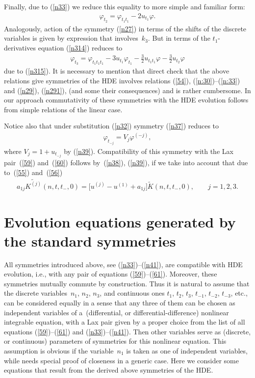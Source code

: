 \documentclass[pdftex]{sigma}
\numberwithin{equation}{section}
\begin{document}
Finally, due to (\ref{n33}) we reduce this equality to more simple and familiar form:
\begin{gather}
\varphi_{t_2}=\varphi_{t_1t_1}-2u_{t_1}\varphi.\label{n34}
\end{gather}
Analogously, action of the symmetry (\ref{n27}) in terms of the shifts of the discrete variables is given by expression that involves~$k_3$. But in terms of the $t_1$-derivatives equation (\ref{n314}) reduces to
\begin{gather}
\varphi_{t_3}=\varphi_{t_1t_1t_1}-3u_{t_1}\varphi_{t_1}-\frac{3}{2}u_{t_1t_1}\varphi -\frac{3}{2}u_{t_2}\varphi\label{n40}
\end{gather}
due to (\ref{n315}). It is necessary to mention that direct check that the above relations give symmetries of the HDE involves relations (\ref{54}), (\ref{n:30})--(\ref{n:33}) and (\ref{n29}), (\ref{n291}), (and some their consequences) and is rather cumbersome. In our approach commutativity of these symmetries with the HDE evolution follows from simple relations of the linear case.

Notice also that under substitution (\ref{n32}) symmetry (\ref{n37}) reduces to
\begin{gather}
 \varphi_{t_{-j}}=V_{j}\varphi^{(-j)},\label{n41}
\end{gather}
where $V_{j}=1+u_{t_{-j}}$ by (\ref{n39}). Compatibility of this symmetry with the Lax pair~(\ref{59}) and~(\ref{60}) follows by~(\ref{n38}), (\ref{n39}), if we take into account that due to~(\ref{55}) and~(\ref{56})
\begin{gather*}
a_{1j}\widetilde{K^{(j)}}(n,t,t_{-},0)=\big[u^{(j)}-u^{(1)}+a_{1j}\big]\widetilde{K}(n,t,t_{-},0),\qquad j=1,2,3.%
\end{gather*}

\section{Evolution equations generated by the standard symmetries}\label{eqs}
All symmetries introduced above, see (\ref{n33})--(\ref{n41}), are compatible with HDE evolution, i.e., with any pair of equations (\ref{59})--(\ref{61}). Moreover, these symmetries mutually commute by construction. Thus it is natural to assume that the discrete variables~$n_1$, $n_2$, $n_3$, and continuous ones $t_1$, $t_2$, $t_3$, $t_{-1}$, $t_{-2}$, $t_{-3}$, etc., can be considered equally in a sense that any three of them can be chosen as independent variables of a~(dif\/ferential, or dif\/ferential-dif\/ference) nonlinear integrable equation, with a Lax pair given by a proper choice from the list of all equations \mbox{(\ref{59})--(\ref{61})} and (\ref{n33})--(\ref{n41}). Then other variables serve as (discrete, or continuous) para\-me\-ters of symmetries for this nonlinear equation. This assumption is obvious if the variable~$n_1$ is taken as one of independent variables, while needs special proof of closeness in a generic case. Here we consider some equations that result from the derived above symmetries of the HDE.
\end{document}
